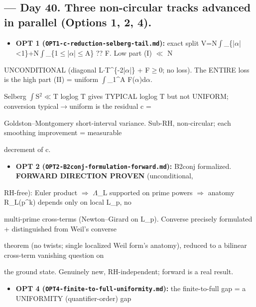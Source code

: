 \documentclass[10pt]{article}
\begin{document}
\subsection*{ --- Day 40. Three non-circular tracks advanced in parallel (Options 1, 2, 4).}
\begin{itemize}
\item \textbf{OPT 1 (\texttt{OPT1-c-reduction-selberg-tail.md}):} exact split V=N\ensuremath{\int}\_\{|\ensuremath{\alpha}|<1\}+N\ensuremath{\int}\_\{1\ensuremath{\le}|\ensuremath{\alpha}|\ensuremath{\le}A\} ?? F. Low part (I) \ensuremath{\ll} N
\end{itemize}
  UNCONDITIONAL (diagonal L\ensuremath{\cdot}T\textasciicircum{}\{-2|\ensuremath{\alpha}|\} + F\ensuremath{\ge}0; no loss). The ENTIRE loss is the high part (II) = uniform \ensuremath{\int}\_1\textasciicircum{}A F(\ensuremath{\alpha})d\ensuremath{\alpha}.\par
  Selberg \ensuremath{\int}S\ensuremath{^2}\ensuremath{\ll}T loglog T gives TYPICAL loglog T but not UNIFORM; conversion typical\ensuremath{\to}uniform is the residual c =\par
  Goldston--Montgomery short-interval variance. Sub-RH, non-circular; each smoothing improvement = measurable\par
  decrement of c.\par
\begin{itemize}
\item \textbf{OPT 2 (\texttt{OPT2-B2conj-formulation-forward.md}):} B2conj formalized. \textbf{FORWARD DIRECTION PROVEN} (unconditional,
\end{itemize}
  RH-free): Euler product \ensuremath{\Rightarrow} \ensuremath{\Lambda}\_L supported on prime powers \ensuremath{\Rightarrow} anatomy R\_L(p\textasciicircum{}k) depends only on local L\_p, no\par
  multi-prime cross-terms (Newton--Girard on L\_p). Converse precisely formulated + distinguished from Weil's converse\par
  theorem (no twists; single localized Weil form's anatomy), reduced to a bilinear cross-term vanishing question on\par
  the ground state. Genuinely new, RH-independent; forward is a real result.\par
\begin{itemize}
\item \textbf{OPT 4 (\texttt{OPT4-finite-to-full-uniformity.md}):} the finite-to-full gap = a UNIFORMITY (quantifier-order) gap
\end{itemize}
\end{document}
